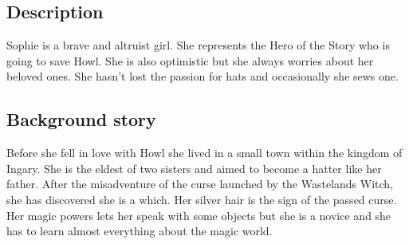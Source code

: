 \subsection{Description}
Sophie is a brave and altruist girl. She represents the Hero of the Story who is going to save Howl. She is also optimistic but she always worries about her beloved ones. She hasn’t lost the passion for hats and occasionally she sews one.

\subsection{Background story}
Before she fell in love with Howl she lived in a small town within the kingdom of Ingary. She is the eldest of two sisters and aimed to become a hatter like her father. After the misadventure of the curse launched by the Wastelands Witch, she has discovered she is a which. Her silver hair is the sign of the passed curse. Her magic powers lets her speak with some objects but she is a novice and she has to learn almost everything about the magic world.
